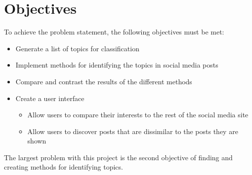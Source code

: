 \section{Objectives}
To achieve the problem statement, the following objectives must be met:
\begin{itemize}
    \item Generate a list of topics for classification
    \item Implement methods for identifying the topics in social media posts
    \item Compare and contrast the results of the different methods
    \item Create a user interface
    \begin {itemize}
        \item Allow users to compare their interests to the rest of the social media site
        \item Allow users to discover posts that are dissimilar to the posts they are shown
    \end{itemize}
\end{itemize}
The largest problem with this project is the second objective of finding and creating methods for identifying topics.